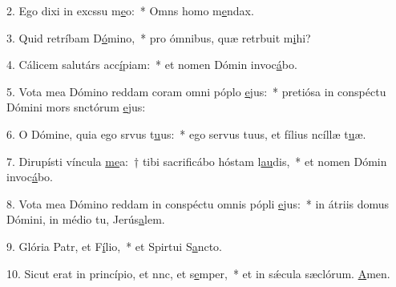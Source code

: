2. Ego dixi in excssu m\uline{e}o:~* Omns homo m\uline{e}ndax.\par 
3. Quid retríbam D\uline{ó}mino,~* pro ómnibus, quæ retrbuit m\uline{i}hi?\par 
4. Cálicem salutárs acc\uline{í}piam:~* et nomen Dómin invoc\uline{á}bo.\par 
5. Vota mea Dómino reddam coram omni póplo \uline{e}jus:~* pretiósa in conspéctu Dómini mors snctórum \uline{e}jus:\par 
6. O Dómine, quia ego srvus t\uline{u}us:~* ego servus tuus, et fílius ncíllæ t\uline{u}æ.\par 
7. Dirupísti víncula \uline{me}a:~† tibi sacrificábo hóstam l\uline{au}dis,~* et nomen Dómin invoc\uline{á}bo.\par 
8. Vota mea Dómino reddam in conspéctu omnis pópli \uline{e}jus:~* in átriis domus Dómini, in médio tu, Jerús\uline{a}lem.\par 
9. Glória Patr, et F\uline{í}lio,~* et Spirtui S\uline{a}ncto.\par 
10. Sicut erat in princípio, et nnc, et s\uline{e}mper,~* et in sǽcula sæclórum. \uline{A}men.\par 
